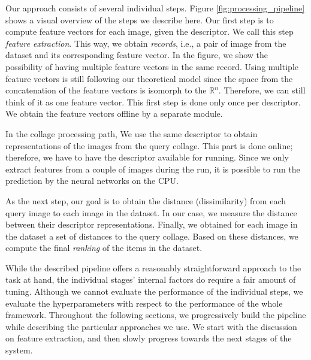 Our approach consists of several individual steps. Figure \ref{fig:processing_pipeline} shows a visual overview of the steps we describe here. Our first step is to compute feature vectors for each image, given the descriptor. We call this step \emph{feature extraction}. This way, we obtain \emph{records}, i.e., a pair of image from the dataset and its corresponding feature vector. In the figure, we show the possibility of having multiple feature vectors in the same record. Using multiple feature vectors is still following our theoretical model since the space from the concatenation of the feature vectors is isomorph to the $\mathbb{R}^n$. Therefore, we can still think of it as one feature vector. This first step is done only once per descriptor. We obtain the feature vectors offline by a separate module.

In the collage processing path, We use the same descriptor to obtain representations of the images from the query collage. This part is done online; therefore, we have to have the descriptor available for running. Since we only extract features from a couple of images during the run, it is possible to run the prediction by the neural networks on the CPU.

As the next step, our goal is to obtain the distance (dissimilarity) from each query image to each image in the dataset. In our case, we measure the distance between their descriptor representations. Finally, we obtained for each image in the dataset a set of distances to the query collage. Based on these distances, we compute the final \emph{ranking} of the items in the dataset.

While the described pipeline offers a reasonably straightforward approach to the task at hand, the individual stages' internal factors do require a fair amount of tuning. Although we cannot evaluate the performance of the individual steps, we evaluate the hyperparameters with respect to the performance of the whole framework. Throughout the following sections, we progressively build the pipeline while describing the particular approaches we use. We start with the discussion on feature extraction, and then slowly progress towards the next stages of the system.  




